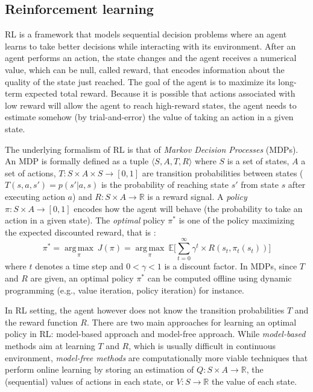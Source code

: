 \subsection{Reinforcement learning}

RL is a framework that models sequential decision
problems where an agent learns to take better decisions while interacting with
its environment. After an agent performs an action, the state changes and the
agent receives a numerical value, which can be null, called reward, that encodes information
about the quality of the state just reached. The goal of the agent is to maximize
its long-term expected total reward. Because it is possible that actions associated 
with low reward will allow the agent to reach high-reward states, the agent
needs to estimate somehow (by trial-and-error) the value of taking an action in
a given state.

The underlying formalism of RL is that of {\em Markov Decision Processes} (MDPs).
An MDP is formally defined as a tuple $\langle S, A, T, R \rangle$ where $S$ is a set of states, $A$ a set of actions, $T : S \times A \times S \rightarrow [0, 1]$ 
are transition probabilities between states
($T(s,a,s')=p(s'|a,s)$ is the probability of reaching state $s'$ from state $s$ after executing action $a$) and 
$R : S \times A \rightarrow \mathbb{R}$ is a reward signal. A \textit{policy} $\pi : S \times A \rightarrow [0, 1]$ encodes how the agent will behave (the probability
to take an action in a given state).
The {\em optimal} policy $\pi^*$ is one of the policy maximizing the expected discounted reward, that is :
\begin{equation}
\pi^* = \underset{\pi}{\operatorname{arg\,max}}\ J(\pi) = \underset{\pi}{\operatorname{arg\,max}}\ \mathbb{E} \Big[ \sum\limits_{t=0}^{\infty} \gamma^t \times R(s_t, \pi_t(s_t)) \Big]
\end{equation}
where $t$ denotes a time step and $0 < \gamma < 1$ is a discount factor.
In MDPs, since $T$ and $R$ are given, an optimal policy $\pi^*$ can be computed offline using dynamic programming (e.g., value iteration, policy                                                                  
iteration) \cite{Howard1960} for instance.

In RL setting, the agent however does not know the transition probabilities $T$ and the reward function $R$.
There are two main approaches for learning an optimal policy in RL: model-based approach and model-free approach.
While {\em model-based} methods aim at learning $T$ and $R$, which is usually difficult in continuous environment,
{\em model-free methods} are computationally more viable techniques
that perform online learning by storing an estimation of $Q : S \times A \rightarrow \mathbb{R}$, the (sequential) values of actions in each state,
or $V : S \rightarrow \mathbb{R}$ the value of each state.

